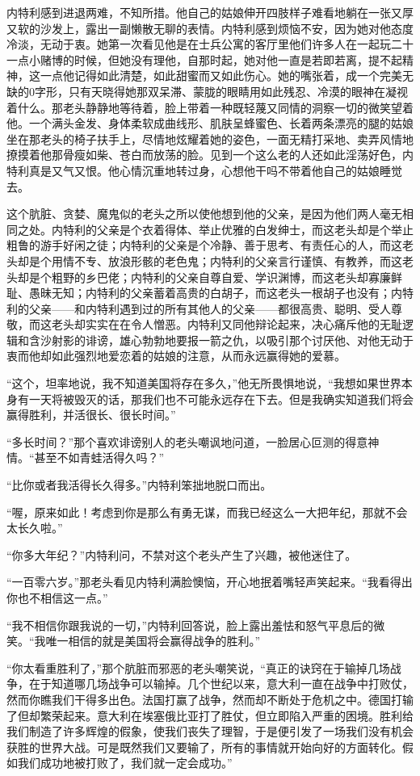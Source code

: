     内特利感到进退两难，不知所措。他自己的姑娘伸开四肢样子难看地躺在一张又厚又软的沙发上，露出一副懒散无聊的表情。内特利感到烦恼不安，因为她对他态度冷淡，无动于衷。她第一次看见他是在士兵公寓的客厅里他们许多人在一起玩二十一点小赌博的时候，但她没有理他，自那时起，她对他一直是若即若离，提不起精神，这一点他记得如此清楚，如此甜蜜而又如此伤心。她的嘴张着，成一个完美无缺的0字形，只有天晓得她那双呆滞、蒙胧的眼睛用如此残忍、冷漠的眼神在凝视着什么。那老头静静地等待着，脸上带着一种既轻蔑又同情的洞察一切的微笑望着他。一个满头金发、身体柔软成曲线形、肌肤呈蜂蜜色、长着两条漂亮的腿的姑娘坐在那老头的椅子扶手上，尽情地炫耀着她的姿色，一面无精打采地、卖弄风情地撩摸着他那骨瘦如柴、苍白而放荡的脸。见到一个这么老的人还如此淫荡好色，内特利真是又气又恨。他心情沉重地转过身，心想他干吗不带着他自己的姑娘睡觉去。

    这个肮脏、贪婪、魔鬼似的老头之所以使他想到他的父亲，是因为他们两人毫无相同之处。内特利的父亲是个衣着得体、举止优雅的白发绅士，而这老头却是个举止粗鲁的游手好闲之徒；内特利的父亲是个冷静、善于思考、有责任心的人，而这老头却是个用情不专、放浪形骸的老色鬼；内特利的父亲言行谨慎、有教养，而这老头却是个粗野的乡巴佬；内特利的父亲自尊自爱、学识渊博，而这老头却寡廉鲜耻、愚昧无知；内特利的父亲蓄着高贵的白胡子，而这老头一根胡子也没有；内特利的父亲——和内特利遇到过的所有其他人的父亲——都很高贵、聪明、受人尊敬，而这老头却实实在在令人憎恶。内特利又同他辩论起来，决心痛斥他的无耻逻辑和含沙射影的诽谤，雄心勃勃地要报一箭之仇，以吸引那个讨厌他、对他无动于衷而他却如此强烈地爱恋着的姑娘的注意，从而永远赢得她的爱慕。

    “这个，坦率地说，我不知道美国将存在多久，”他无所畏惧地说，“我想如果世界本身有一天将被毁灭的话，那我们也不可能永远存在下去。但是我确实知道我们将会赢得胜利，并活很长、很长时间。”

    “多长时间？”那个喜欢诽谤别人的老头嘲讽地问道，一脸居心叵测的得意神情。“甚至不如青蛙活得久吗？”

    “比你或者我活得长久得多。”内特利笨拙地脱口而出。

    “喔，原来如此！考虑到你是那么有勇无谋，而我已经这么一大把年纪，那就不会太长久啦。”

    “你多大年纪？”内特利问，不禁对这个老头产生了兴趣，被他迷住了。

    “一百零六岁。”那老头看见内特利满脸懊恼，开心地抿着嘴轻声笑起来。“我看得出你也不相信这一点。”

    “我不相信你跟我说的一切，”内特利回答说，脸上露出羞怯和怒气平息后的微笑。“我唯一相信的就是美国将会赢得战争的胜利。”

    “你太看重胜利了，”那个肮脏而邪恶的老头嘲笑说，“真正的诀窍在于输掉几场战争，在于知道哪几场战争可以输掉。几个世纪以来，意大利一直在战争中打败仗，然而你瞧我们干得多出色。法国打赢了战争，然而却不断处于危机之中。德国打输了但却繁荣起来。意大利在埃塞俄比亚打了胜仗，但立即陷入严重的困境。胜利给我们制造了许多辉煌的假象，使我们丧失了理智，于是便引发了一场我们没有机会获胜的世界大战。可是既然我们又要输了，所有的事情就开始向好的方面转化。假如我们成功地被打败了，我们就一定会成功。”

